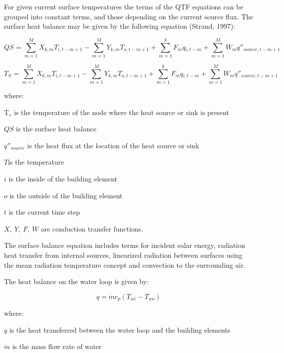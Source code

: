 For given current surface temperatures the terms of the QTF equations can be grouped into constant terms, and those depending on the current source flux. The surface heat balance may be given by the following equation (Strand, 1997):

\begin{equation}
QS{}_{} = \sum\limits_{m = 1}^M {X{}_{k,m}} T{}_{i,t - m + 1} - \sum\limits_{m = 1}^M {Y{}_{k,m}} T{}_{o,t - m + 1} + \sum\limits_{m = 1}^k {F{}_m} q{}_{i,t - m} + \sum\limits_{m = 1}^M {W{}_m} {q''}{}_{source,t - m + 1}
\end{equation}

\begin{equation}
T{}_S{}_{} = \sum\limits_{m = 1}^M {X{}_{k,m}} T{}_{i,t - m + 1} - \sum\limits_{m = 1}^M {Y{}_{k,m}} T{}_{o,t - m + 1} + \sum\limits_{m = 1}^k {F{}_m} q{}_{i,t - m} + \sum\limits_{m = 1}^M {W{}_m} q''{}_{source,t - m + 1}
\end{equation}

where:

T\(_{s}\) is the temperature of the node where the heat source or sink is present

\(QS\) is the surface heat balance

\({q''_{source}}\) is the heat flux at the location of the heat source or sink

\(T\)is the temperature

\(i\) is the inside of the building element

\(o\) is the outside of the building element

\(t\) is the current time step

\(X,~Y,~F,~W\) are conduction transfer functions.

The surface balance equation includes terms for incident solar energy, radiation heat transfer from internal sources, linearized radiation between surfaces using the mean radiation temperature concept and convection to the surrounding air.

The heat balance on the water loop is given by:

\begin{equation}
q = \dot mc{}_p(T{}_{wi} - T{}_{wo})
\end{equation}

where:

\(q\) is the heat transferred between the water loop and the building elements

\(\dot m\) is the mass flow rate of water

